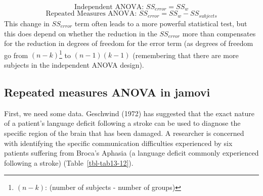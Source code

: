 \documentclass[
  a4paper,
]{book}
\begin{document}
\[\text{Independent ANOVA: } SS_{error} = SS_w\]
\[\text{Repeated Measures ANOVA: } SS_{error} = SS_w - SS_{subjects}\]
This change in \(SS_{error}\) term often leads to a more powerful
statistical test, but this does depend on whether the reduction in the
\(SS_{error}\) more than compensates for the reduction in degrees of
freedom for the error term (as degrees of freedom go from
\((n - k)\)\footnote{\((n - k)\): (number of subjects - number of
  groups)} to \((n - 1)(k - 1)\) (remembering that there are more
subjects in the independent ANOVA design).

\hypertarget{repeated-measures-anova-in-jamovi}{%
\subsection{Repeated measures ANOVA in
jamovi}\label{repeated-measures-anova-in-jamovi}}

First, we need some data. Geschwind (1972) has suggested that the exact
nature of a patient's language deficit following a stroke can be used to
diagnose the specific region of the brain that has been damaged. A
researcher is concerned with identifying the specific communication
difficulties experienced by six patients suffering from Broca's Aphasia
(a language deficit commonly experienced following a stroke)
(Table~\ref{tbl-tab13-12}).

\hypertarget{tbl-tab13-12}{}
 
  \providecommand{\huxb}[2]{\arrayrulecolor[RGB]{#1}\global\arrayrulewidth=#2pt}
  \providecommand{\huxvb}[2]{\color[RGB]{#1}\vrule width #2pt}
  \providecommand{\huxtpad}[1]{\rule{0pt}{#1}}
  \providecommand{\huxbpad}[1]{\rule[-#1]{0pt}{#1}}
\end{document}
